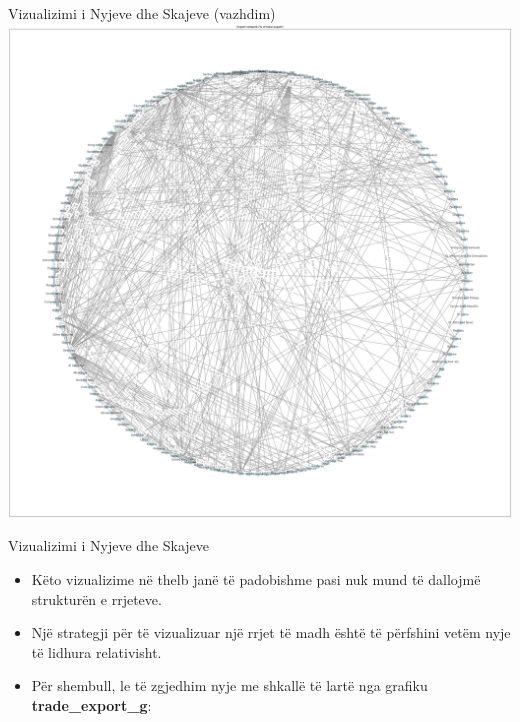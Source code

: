 \documentclass[
  ignorenonframetext,
]{beamer}
\begin{document}
\begin{frame}{Vizualizimi i Nyjeve dhe Skajeve (vazhdim)}
\protect\hypertarget{vizualizimi-i-nyjeve-dhe-skajeve-vazhdim-2}{}
\includegraphics{./Figs/difrrjet.png}
\end{frame}

\begin{frame}{Vizualizimi i Nyjeve dhe Skajeve}
\protect\hypertarget{vizualizimi-i-nyjeve-dhe-skajeve-3}{}
\begin{itemize}
\item
  Këto vizualizime në thelb janë të padobishme pasi nuk mund të dallojmë
  strukturën e rrjeteve.
\item
  Një strategji për të vizualizuar një rrjet të madh është të përfshini
  vetëm nyje të lidhura relativisht.
\item
  Për shembull, le të zgjedhim nyje me shkallë të lartë nga grafiku
  \textbf{trade\_export\_g}:
\end{itemize}
\end{frame}
\end{document}
